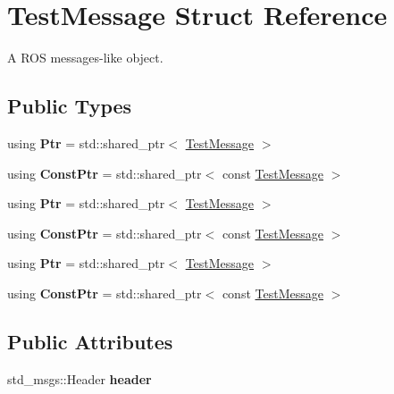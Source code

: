 \hypertarget{struct_test_message}{}\section{Test\+Message Struct Reference}
\label{struct_test_message}


A R\+OS messages-\/like object.  


\subsection*{Public Types}
\begin{DoxyCompactItemize}
\item 
\mbox{\label{struct_test_message_a61078aaa4d453510b1a9768f39b779b8}} 
using {\bfseries Ptr} = std\+::shared\+\_\+ptr$<$ \hyperlink{struct_test_message}{Test\+Message} $>$
\item 
\mbox{\label{struct_test_message_aacafaf7937f1d6971e0fd32089695ca8}} 
using {\bfseries Const\+Ptr} = std\+::shared\+\_\+ptr$<$ const \hyperlink{struct_test_message}{Test\+Message} $>$
\item 
\mbox{\label{struct_test_message_a61078aaa4d453510b1a9768f39b779b8}} 
using {\bfseries Ptr} = std\+::shared\+\_\+ptr$<$ \hyperlink{struct_test_message}{Test\+Message} $>$
\item 
\mbox{\label{struct_test_message_aacafaf7937f1d6971e0fd32089695ca8}} 
using {\bfseries Const\+Ptr} = std\+::shared\+\_\+ptr$<$ const \hyperlink{struct_test_message}{Test\+Message} $>$
\item 
\mbox{\label{struct_test_message_a61078aaa4d453510b1a9768f39b779b8}} 
using {\bfseries Ptr} = std\+::shared\+\_\+ptr$<$ \hyperlink{struct_test_message}{Test\+Message} $>$
\item 
\mbox{\label{struct_test_message_aacafaf7937f1d6971e0fd32089695ca8}} 
using {\bfseries Const\+Ptr} = std\+::shared\+\_\+ptr$<$ const \hyperlink{struct_test_message}{Test\+Message} $>$
\end{DoxyCompactItemize}
\subsection*{Public Attributes}
\begin{DoxyCompactItemize}
\item 
\mbox{\label{struct_test_message_a3fa194f99a95061a0c390f18be03394e}} 
std\+\_\+msgs\+::\+Header {\bfseries header}
\end{DoxyCompactItemize}


